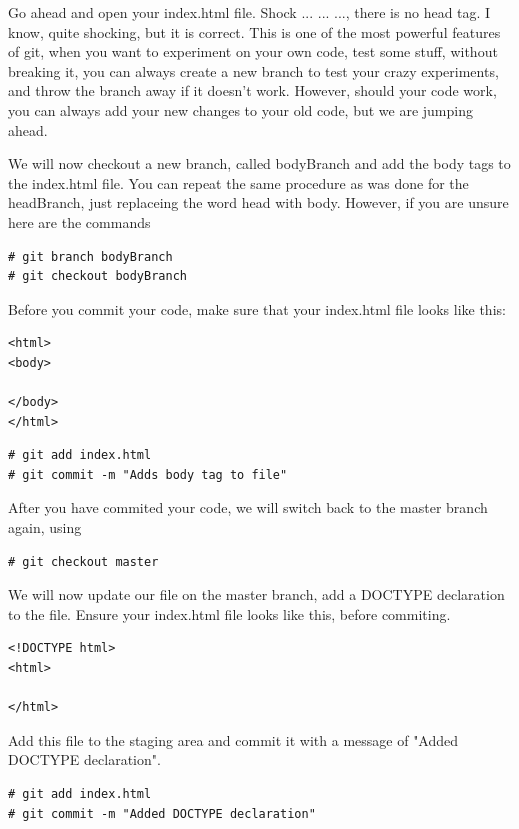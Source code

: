 \documentclass[a4paper,10pt]{article}
\begin{document}
Go ahead and open your index.html file. Shock ... ... ..., there is no head tag. I know, quite shocking, but it is correct. This is one of the most powerful features of git, when you want to experiment on your own code, test some stuff, without breaking it, you can always create a new branch to test your crazy experiments, and throw the branch away if it doesn't work. However, should your code work, you can always add your new changes to your old code, but we are jumping ahead.

We will now checkout a new branch, called bodyBranch and add the body tags to the index.html file. You can repeat the same procedure as was done for the headBranch, just replaceing the word head with body. However, if you are unsure here are the commands
\begin{lstlisting}[style=TerminalStyle]
# git branch bodyBranch
# git checkout bodyBranch
\end{lstlisting}

 Before you commit your code, make sure that your index.html file looks like this:
\begin{lstlisting}[style=HtmlStyle]
<html>
<body>

</body>
</html> 
\end{lstlisting}

\begin{lstlisting}[style=TerminalStyle]
# git add index.html
# git commit -m "Adds body tag to file"
\end{lstlisting}

After you have commited your code, we will switch back to the master branch again, using 
\begin{lstlisting}[style=TerminalStyle]
# git checkout master
\end{lstlisting}

We will now update our file on the master branch, add a DOCTYPE declaration to the file. Ensure your index.html file looks like this, before commiting.
\begin{lstlisting}[style=HtmlStyle]
<!DOCTYPE html>
<html>

</html> 
\end{lstlisting}

Add this file to the staging area and commit it with a message of "Added DOCTYPE declaration".
\begin{lstlisting}[style=TerminalStyle]
# git add index.html
# git commit -m "Added DOCTYPE declaration"
\end{lstlisting}
\end{document}
